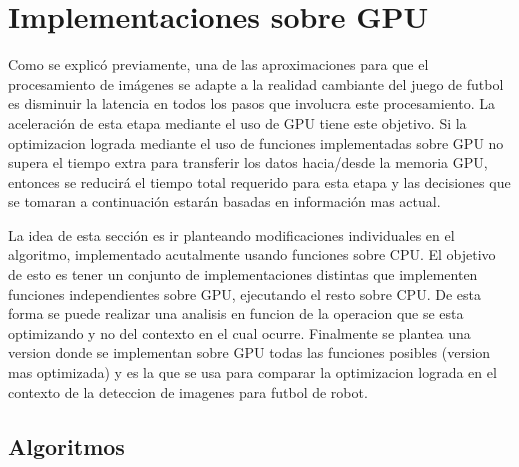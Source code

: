 \documentclass[a4paper,10pt]{report}
\begin{document}
\section{Implementaciones sobre GPU}


Como se explicó previamente, una de las aproximaciones para que el procesamiento de imágenes se adapte a la realidad cambiante del juego de futbol es disminuir la latencia en todos los pasos que involucra este procesamiento.
La aceleración de esta etapa mediante el uso de GPU tiene este objetivo. 
Si la optimizacion lograda mediante el uso de funciones implementadas sobre GPU no supera el tiempo extra para transferir los datos hacia/desde la memoria GPU, entonces se reducirá el tiempo total requerido para esta etapa y las decisiones que se tomaran a continuación estarán basadas en información mas actual.

La idea de esta sección es ir planteando modificaciones individuales en el algoritmo, implementado acutalmente usando funciones sobre CPU.
El objetivo de esto es tener un conjunto de implementaciones distintas que implementen funciones independientes sobre GPU, ejecutando el resto sobre CPU.
De esta forma se puede realizar una analisis en funcion de la operacion que se esta optimizando y no del contexto en el cual ocurre.
Finalmente se plantea una version donde se implementan sobre GPU todas las funciones posibles (version mas optimizada) y es la que se usa para comparar la optimizacion lograda en el contexto de la deteccion de imagenes para futbol de robot.






\subsection{Algoritmos}

\end{document}
